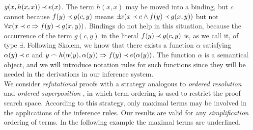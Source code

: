 \( g(x,h(x,x))\mathbin{\prec} e(x)\).  The term $h(x,x)$ may be moved into a binding,
but $c$ cannot because \(f(y)\mathbin{\prec} g(c,y)\) means \(\exists x(x\mathbin{\prec} c\land
f(y)\mathbin{\prec} g(x,y))\) but not \(\forall x(x\mathbin{\prec} c\mathrel\Rightarrow f(y)\mathbin{\prec} g(x,y))\).
Bindings do not help in this situation, because the occurrence of the term $g(c,y)$ 
in the literal \(f(y)\mathbin{\prec} g(c,y)\) is, as we call it, of type $\exists$.  
Following Skolem, we know that
there exists a function $\alpha$ satisfying \(\alpha(y)\mathbin{\prec} c\) and \(y\mathbin{\frown}
h(\alpha(y),\alpha(y))\mathrel\Rightarrow f(y)\mathbin{\prec} e(\alpha(y))\).  The function $\alpha$
is a semantical object, and we will introduce notation rules for such
functions since they will be needed in the derivations in
our inference system.\\[1ex]
%
We consider {\em refutational} proofs with a strategy analogous
to {\em ordered resolution} and {\em ordered superposition} \cite{BG,PP},
in which term ordering is used to restrict the proof search space.  According to this
strategy, only maximal terms may be involved in the applications of
the inference rules. Our results are valid for any {\em simplification} ordering
\cite {Der} of terms.  In the following example the maximal terms are underlined.

